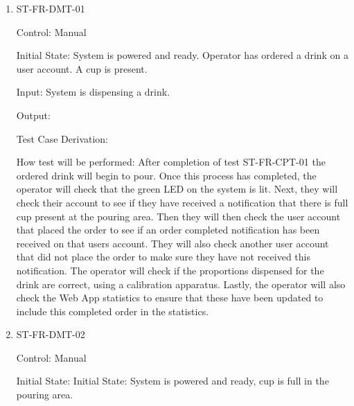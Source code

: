 \documentclass[12pt, titlepage]{article}
\begin{document}
\begin{enumerate}

\item{ST-FR-DMT-01\\}

Control: Manual
					
Initial State: System is powered and ready. Operator has ordered a drink on a user account. A cup is present.
					
Input: System is dispensing a drink.
					
Output: 

Test Case Derivation: 
					
How test will be performed: After completion of test ST-FR-CPT-01 the ordered drink will begin to pour. Once this process has completed, the operator will check that the green LED on the system is lit. Next, they will check their account to see if they have received a notification that there is full cup present at the pouring area. Then they will then check the user account that placed the order to see if an order completed notification has been received on that users account. They will also check another user account that did not place the order to make sure they have not received this notification. The operator will check if the proportions dispensed for the drink are correct, using a calibration apparatus. Lastly, the operator will also check the Web App statistics to ensure that these have been updated to include this completed order in the statistics.

\item{ST-FR-DMT-02\\}

Control: Manual

Initial State: Initial State: System is powered and ready, cup is full in the pouring area.


\end{enumerate}
\end{document}
